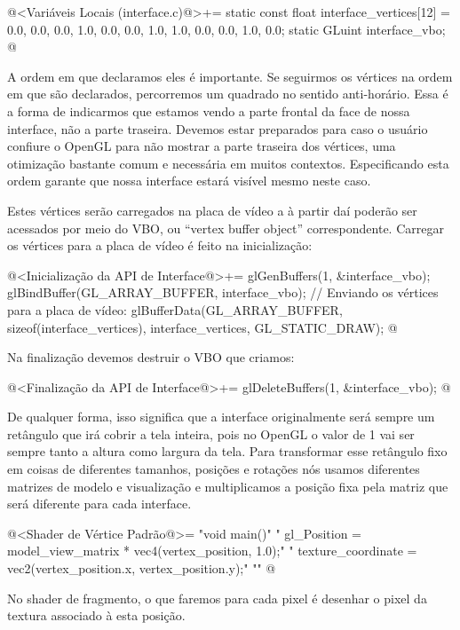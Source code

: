 \iniciocodigo
@<Variáveis Locais (interface.c)@>+=
static const float interface_vertices[12] = {0.0, 0.0, 0.0,
                                             1.0, 0.0, 0.0,
                                             1.0, 1.0, 0.0,
                                             0.0, 1.0, 0.0};
static GLuint interface_vbo;
@
\fimcodigo

A ordem em que declaramos eles é importante. Se seguirmos os vértices
na ordem em que são declarados, percorremos um quadrado no sentido
anti-horário. Essa é a forma de indicarmos que estamos vendo a parte
frontal da face de nossa interface, não a parte traseira. Devemos
estar preparados para caso o usuário confiure o OpenGL para não
mostrar a parte traseira dos vértices, uma otimização bastante comum e
necessária em muitos contextos. Especificando esta ordem garante que
nossa interface estará visível mesmo neste caso.

Estes vértices serão carregados na placa de vídeo a à partir daí
poderão ser acessados por meio do VBO, ou ``vertex buffer object''
correspondente. Carregar os vértices para a placa de vídeo é feito na
inicialização:

\iniciocodigo
@<Inicialização da API de Interface@>+=
glGenBuffers(1, &interface_vbo);
glBindBuffer(GL_ARRAY_BUFFER, interface_vbo);
// Enviando os vértices para a placa de vídeo:
glBufferData(GL_ARRAY_BUFFER, sizeof(interface_vertices), interface_vertices,
             GL_STATIC_DRAW);
@
\fimcodigo

Na finalização devemos destruir o VBO que criamos:

\iniciocodigo
@<Finalização da API de Interface@>+=
glDeleteBuffers(1, &interface_vbo);
@
\fimcodigo

De qualquer forma, isso significa que a interface originalmente será
sempre um retângulo que irá cobrir a tela inteira, pois no OpenGL o
valor de 1 vai ser sempre tanto a altura como largura da tela.  Para
transformar esse retângulo fixo em coisas de diferentes tamanhos,
posições e rotações nós usamos diferentes matrizes de modelo e
visualização e multiplicamos a posição fixa pela matriz que será
diferente para cada interface.

\iniciocodigo
@<Shader de Vértice Padrão@>=
"void main(){\n"
"  gl_Position = model_view_matrix * vec4(vertex_position, 1.0);\n"
"  texture_coordinate = vec2(vertex_position.x, vertex_position.y);\n"
"}\n"
@
\fimcodigo

No shader de fragmento, o que faremos para cada pixel é desenhar o
pixel da textura associado à esta posição.

